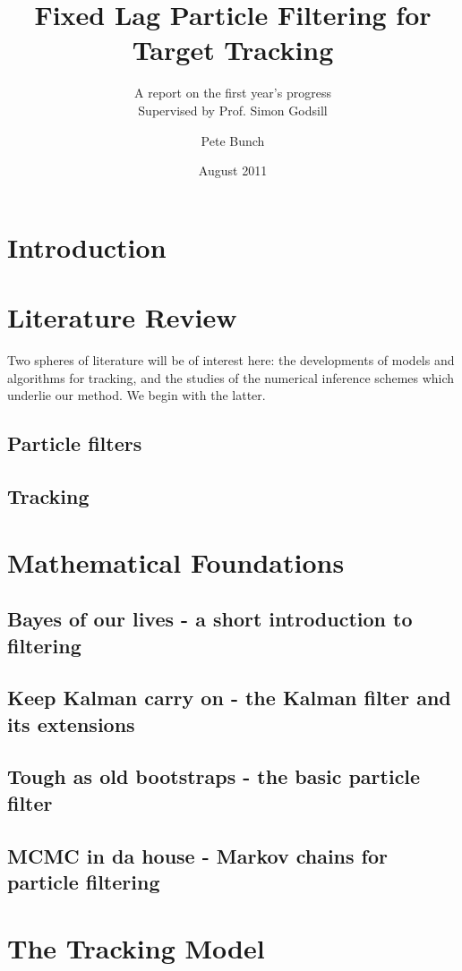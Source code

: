 \documentclass{RJWThesis}
\title{Fixed Lag Particle Filtering for Target Tracking}
\subtitle{A report on the first year's progress \\ \bigskip Supervised by Prof. Simon Godsill}
\author{Pete Bunch}
\date{August 2011}
\begin{document}
\maketitle
\tableofcontents


\chapter{Introduction}


\chapter{Literature Review}
Two spheres of literature will be of interest here: the developments of models and algorithms for tracking, and the studies of the numerical inference schemes which underlie our method. We begin with the latter.
\section{Particle filters}

\section{Tracking}


\chapter{Mathematical Foundations} \label{chap:basics}
\section{Bayes of our lives - a short introduction to filtering}

\section{Keep Kalman carry on - the Kalman filter and its extensions}

\section{Tough as old bootstraps - the basic particle filter}

\section{MCMC in da house - Markov chains for particle filtering}


\chapter{The Tracking Model}

\end{document}
